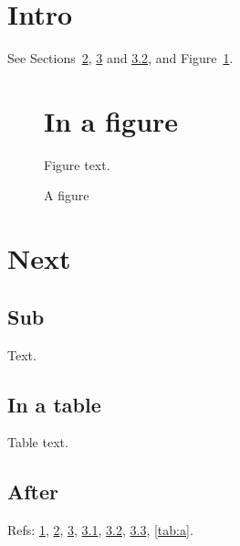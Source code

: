 \documentclass{article}
\begin{document}
\section{Intro}\label{sec:intro}
See Sections~\ref{sec:infig}, \ref{sec:next} and \ref{sec:intab}, and Figure~\ref{fig:a}.
\begin{figure}[h]
\section{In a figure}\label{sec:infig}
Figure text.
\caption{A figure}\label{fig:a}
\end{figure}
\section{Next}\label{sec:next}
\subsection{Sub}\label{sec:sub}
Text.
\begin{table}[h]
\subsection{In a table}\label{sec:intab}
Table text.
\caption{A table}\label{tab:a}
\end{table}
\subsection{After}\label{sec:after}
Refs: \ref{sec:intro}, \ref{sec:infig}, \ref{sec:next}, \ref{sec:sub}, \ref{sec:intab}, \ref{sec:after}, \ref{tab:a}.
\end{document}
